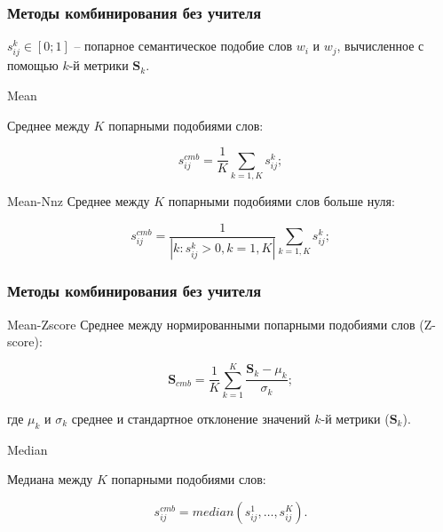 \begin{frame}
\frametitle{Методы комбинирования без учителя}

\item $s_{ij}^k \in [0;1]$ -- попарное семантическое подобие слов $w_i$ и $w_j$, вычисленное с помощью $k$-й метрики $\mathbf{S}_k$.
 
\begin{block}{Mean}

Среднее между $K$ попарными подобиями слов:

$$s_{ij}^{cmb}= \frac{1}{K}\sum_{k=1,K} s_{ij}^k;$$

\end{block} 

\begin{block}{Mean-Nnz} 
Среднее между $K$ попарными подобиями слов больше нуля:

$$s_{ij}^{cmb}= \frac{1}{|k:s_{ij}^k >0,k=1,K|}\sum_{k=1,K} s_{ij}^k;$$

\end{block} 
\end{frame}







\begin{frame}
\frametitle{Методы комбинирования без учителя}


\begin{block}{Mean-Zscore}
Среднее между нормированными попарными подобиями слов (Z-score):

$$\mathbf{S}_{cmb} = \frac{1}{K} \sum_{k=1}^K \frac{\mathbf{S}_k -\mu_k}{\sigma_k};$$

где $\mu_k$ и $\sigma_k$ среднее и стандартное отклонение значений $k$-й метрики ($\mathbf{S}_k$).

\end{block} 

\begin{block}{Median}

Медиана между $K$ попарными подобиями слов:

$$s_{ij}^{cmb}= median(s_{ij}^1,\ldots,s_{ij}^K).$$

\end{block} 

\end{frame}






